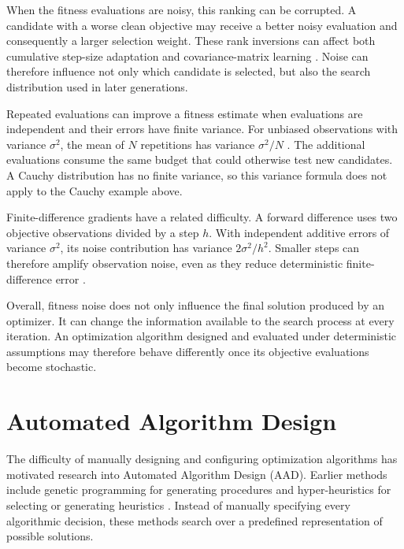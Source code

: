 When the fitness evaluations are noisy, this ranking can be corrupted. A
candidate with a worse clean objective may receive a better noisy evaluation
and consequently a larger selection weight. These rank inversions can affect
both cumulative step-size adaptation and covariance-matrix learning
\cite{Jin2005,Hansen2009}. Noise can therefore influence not only which
candidate is selected, but also the search distribution used in later
generations.

Repeated evaluations can improve a fitness estimate when evaluations are
independent and their errors have finite variance. For unbiased observations
with variance $\sigma^2$, the mean of $N$ repetitions has variance
$\sigma^2/N$ \cite{Jin2005,Qian2020}. The additional evaluations consume
the same budget that could otherwise test new candidates. A Cauchy
distribution has no finite variance, so this variance formula does not apply
to the Cauchy example above.

Finite-difference gradients have a related difficulty. A forward difference
uses two objective observations divided by a step $h$. With independent
additive errors of variance $\sigma^2$, its noise contribution has variance
$2\sigma^2/h^2$. Smaller steps can therefore amplify observation noise,
even as they reduce deterministic finite-difference error \cite{Spall2003}.

Overall, fitness noise does not only influence the final solution produced by
an optimizer. It can change the information available to the search process
at every iteration. An optimization algorithm designed and evaluated under
deterministic assumptions may therefore behave differently once its objective
evaluations become stochastic.

\section{Automated Algorithm Design}
\label{sec:automated_algorithm_design}

The difficulty of manually designing and configuring optimization algorithms
has motivated research into Automated Algorithm Design (AAD). Earlier
methods include genetic programming for generating procedures and
hyper-heuristics for selecting or generating heuristics \cite{Burke2013}.
Instead of manually specifying every algorithmic decision, these methods
search over a predefined representation of possible solutions.

